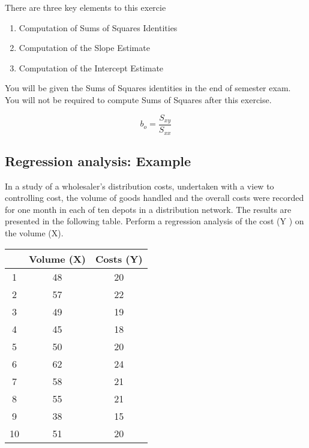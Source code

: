 \documentclass[12pt, a4paper]{report}
\author{ } \date{ }
\theoremstyle{definition}
\theoremstyle{remark}
\begin{document}
	
There are three key elements to this exercie

\begin{enumerate}
\item Computation of Sums of Squares Identities
\item Computation of the Slope Estimate
\item Computation of the Intercept Estimate
\end{enumerate}

You will be given the Sums of Squares identities in the end of semester exam. You will not be required to compute Sums of Squares after this exercise.


\[  b_o = \frac{S_{xy}}{S_{xx}}\]

\newpage
\subsection{Regression analysis: Example}
In a study of a wholesaler’s distribution costs, undertaken with a view to controlling cost, the volume of goods handled and the overall costs were recorded for one month in each of ten depots in a distribution network. The results are presented in the following table. Perform a regression analysis of the cost (Y ) on the volume (X).

\begin{center}
	
	\begin{tabular}{|c|c|c|}\hline
		&  Volume (X)   &  Costs (Y) \\ \hline
		1     &     48     &   20 \\
		2     &    57      &   22 \\
		3     &    49      &   19 \\
		4     &    45      &   18 \\
		5     &    50      &   20 \\
		6     &    62      &   24 \\
		7     &    58      &   21 \\
		8     &    55      &   21 \\
		9     &    38      &   15 \\
		10    &    51      &  20 \\ \hline
	\end{tabular}
\end{center}
\end{document}
